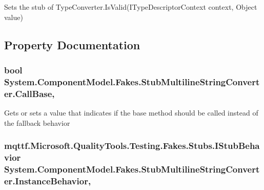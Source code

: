 Sets the stub of Type\-Converter.\-Is\-Valid(\-I\-Type\-Descriptor\-Context context, Object value)



\subsection{Property Documentation}
\hypertarget{class_system_1_1_component_model_1_1_fakes_1_1_stub_multiline_string_converter_a80c687456390e207a87d63ea36aff6c4}{
\subsubsection[{Call\-Base}]{\setlength{\rightskip}{0pt plus 5cm}bool System.\-Component\-Model.\-Fakes.\-Stub\-Multiline\-String\-Converter.\-Call\-Base\hspace{0.3cm}{\ttfamily [get]}, {\ttfamily [set]}}}\label{class_system_1_1_component_model_1_1_fakes_1_1_stub_multiline_string_converter_a80c687456390e207a87d63ea36aff6c4}


Gets or sets a value that indicates if the base method should be called instead of the fallback behavior

\hypertarget{class_system_1_1_component_model_1_1_fakes_1_1_stub_multiline_string_converter_af766735dc4e62d2a7a530ed2921647aa}{
\subsubsection[{Instance\-Behavior}]{\setlength{\rightskip}{0pt plus 5cm}mqttf.\-Microsoft.\-Quality\-Tools.\-Testing.\-Fakes.\-Stubs.\-I\-Stub\-Behavior System.\-Component\-Model.\-Fakes.\-Stub\-Multiline\-String\-Converter.\-Instance\-Behavior\hspace{0.3cm}{\ttfamily [get]}, {\ttfamily [set]}}}\label{class_system_1_1_component_model_1_1_fakes_1_1_stub_multiline_string_converter_af766735dc4e62d2a7a530ed2921647aa}


